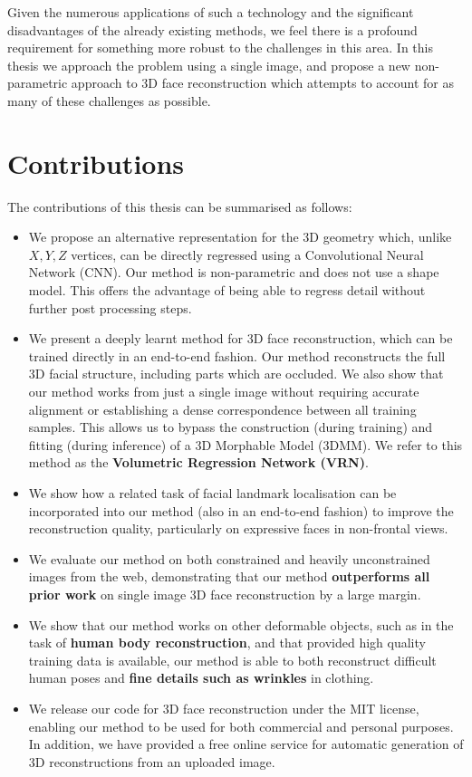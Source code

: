 Given the numerous applications of such a technology and the
significant disadvantages of the already existing methods, we feel
there is a profound requirement for something more robust to the
challenges in this area. In this thesis we approach the problem using
a single image, and propose a new non-parametric approach to 3D face
reconstruction which attempts to account for as many of these
challenges as possible.

\section{Contributions}

The contributions of this thesis can be summarised as follows:

\begin{itemize}
\item %
  We propose an alternative representation for the 3D geometry which,
  unlike $X, Y, Z$ vertices, can be directly regressed using a
  Convolutional Neural Network (CNN). Our method is non-parametric and
  does not use a shape model. This offers the advantage of being able
  to regress detail without further post processing steps.

\item %
  We present a deeply learnt method for 3D face reconstruction, which
  can be trained directly in an end-to-end fashion. Our method
  reconstructs the full 3D facial structure, including parts which are
  occluded. We also show that our method works from just a single
  image without requiring accurate alignment or establishing a dense
  correspondence between all training samples.  This allows us to
  bypass the construction (during training) and fitting (during
  inference) of a 3D Morphable Model (3DMM).  We refer to this method
  as the \textbf{Volumetric Regression Network (VRN)}.

\item We show how a related task of facial landmark localisation can
  be incorporated into our method (also in an end-to-end fashion) to
  improve the reconstruction quality, particularly on expressive faces
  in non-frontal views.

\item We evaluate our method on both constrained and heavily
  unconstrained images from the web, demonstrating that our method
  \textbf{outperforms all prior work} on single image 3D face
  reconstruction by a large margin.

\item We show that our method works on other deformable objects, such
  as in the task of \textbf{human body reconstruction}, and that
  provided high quality training data is available, our method is able
  to both reconstruct difficult human poses and \textbf{fine details
    such as wrinkles} in clothing.

\item We release our code for 3D face reconstruction under the MIT
  license, enabling our method to be used for both commercial and
  personal purposes. In addition, we have provided a free online
  service for automatic generation of 3D reconstructions from an
  uploaded image.
\end{itemize}

